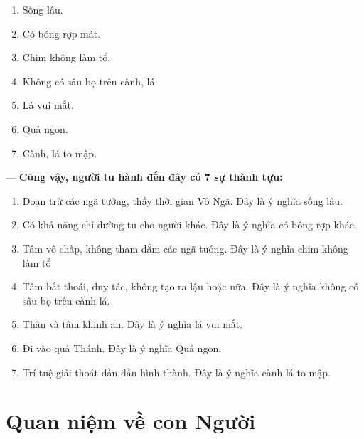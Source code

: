 \begin{enumerate}[label=\itshape\arabic*\upshape/]

    \item Sống lâu.

    \item Có bóng rợp mát.

    \item Chim không làm tổ.

    \item Không có sâu bọ trên cành, lá.

    \item Lá vui mắt.

    \item Quả ngon.

    \item Cành, lá to mập.
\end{enumerate}

--- {\bf Cũng vậy, người tu hành đến đây có 7 sự thành tựu:}

\begin{enumerate}[label=\itshape\arabic*\upshape/]
    \item Đoạn trừ các ngã tưởng, thấy thời gian Vô Ngã. Đây là ý nghĩa sống lâu.

    \item Có khả năng chỉ đường tu cho người khác. Đây là ý nghĩa có bóng rợp khác.

    \item Tâm vô chấp, không tham đắm các ngã tướng. Đây là ý nghĩa chim không làm tổ

    \item Tâm bất thoái, duy tác, không tạo ra lậu hoặc nữa. Đây là ý nghĩa không có sâu bọ trên cành lá.

    \item Thân và tâm khinh an. Đây là ý nghĩa lá vui mắt.

    \item Đi vào quả Thánh. Đây là ý nghĩa Quả ngon.

    \item Trí tuệ giải thoát dần dần hình thành. Đây là ý nghĩa cành lá to mập.
\end{enumerate}

\section{Quan niệm về con Người} %
\label{sec:67_con_nguoi}

